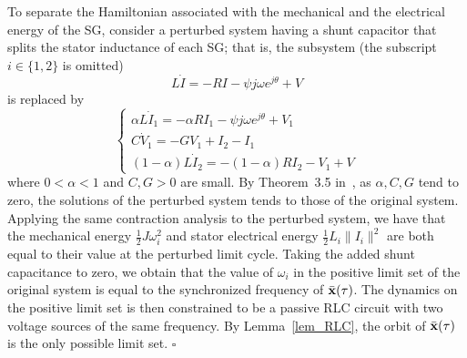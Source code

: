 To separate the Hamiltonian associated with the mechanical and the electrical energy of the SG, consider a perturbed system having a shunt capacitor that splits the stator inductance of each SG; that is, the subsystem (the subscript $i \in \{ 1, 2\}$ is omitted)
\begin{equation*}
    L \dot I = -R I - \psi j \omega e^{j\theta} + V
\end{equation*}
is replaced by
\begin{equation*}
    \begin{cases}
        \alpha L \dot I_1 = -\alpha R I_1 - \psi j \omega e^{j\theta} + V_1 \\
        C \dot V_1 = -G V_1 + I_2 - I_1 \\
        (1 - \alpha) L \dot I_2 = -(1 - \alpha) R I_2 - V_1 + V
    \end{cases}
\end{equation*}
where $0 < \alpha < 1$ and $C, G > 0$ are small.
By Theorem~3.5 in~\cite{Khalil:1173048}, as $\alpha, C, G$ tend to zero, the solutions of the perturbed system tends to those of the original system. 
Applying the same contraction analysis to the perturbed system, we have that the mechanical energy $\frac{1}{2} J \omega_i^2$ and stator electrical energy $\frac{1}{2} L_i \|I_i\|^2$ are both equal to their value at the perturbed limit cycle. Taking the added shunt capacitance to zero, we obtain that the value of $\omega_i$ in the positive limit set of the original system is equal to the synchronized frequency of $\bar{\mathbf{x}}(\tau)$. The dynamics on the positive limit set is then constrained to be a passive RLC circuit with two voltage sources of the same frequency. By Lemma~\ref{lem_RLC}, the orbit of $\bar{\mathbf{x}}(\tau)$ is the only possible limit set. \hfill $\square$
